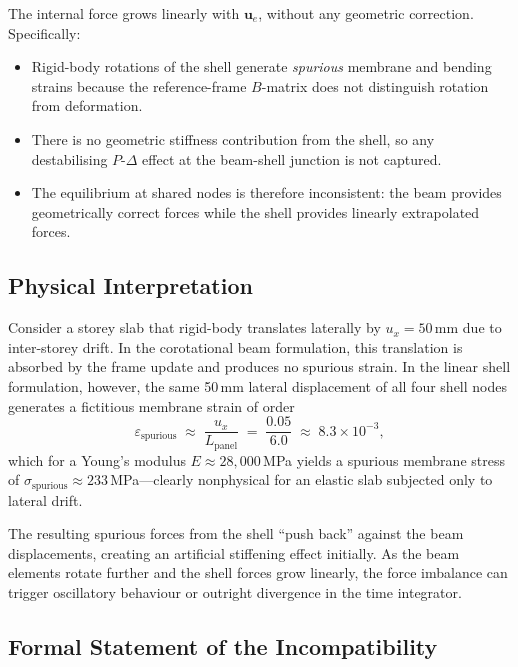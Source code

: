 The internal force grows linearly with $\mathbf{u}_e$, without any
geometric correction.  Specifically:
\begin{itemize}
  \item Rigid-body rotations of the shell generate \emph{spurious}
        membrane and bending strains because the reference-frame $B$-matrix
        does not distinguish rotation from deformation.
  \item There is no geometric stiffness contribution from the shell, so
        any destabilising $P$-$\Delta$ effect at the beam-shell junction is
        not captured.
  \item The equilibrium at shared nodes is therefore inconsistent: the
        beam provides geometrically correct forces while the shell provides
        linearly extrapolated forces.
\end{itemize}

\subsection{Physical Interpretation}

Consider a storey slab that rigid-body translates laterally by
$u_x = 50$\,mm due to inter-storey drift.  In the corotational beam
formulation, this translation is absorbed by the frame update and
produces no spurious strain.  In the linear shell formulation, however,
the same 50\,mm lateral displacement of all four shell nodes generates a
fictitious membrane strain of order
\begin{equation}
  \varepsilon_\mathrm{spurious}
  \;\approx\; \frac{u_x}{L_\mathrm{panel}}
  \;=\; \frac{0.05}{6.0}
  \;\approx\; 8.3 \times 10^{-3},
\end{equation}
which for a Young's modulus $E \approx 28{,}000$\,MPa yields a spurious
membrane stress of $\sigma_\mathrm{spurious} \approx 233$\,MPa---clearly
nonphysical for an elastic slab subjected only to lateral drift.

The resulting spurious forces from the shell ``push back'' against the
beam displacements, creating an artificial stiffening effect initially.
As the beam elements rotate further and the shell forces grow linearly,
the force imbalance can trigger oscillatory behaviour or outright
divergence in the time integrator.

\subsection{Formal Statement of the Incompatibility}

